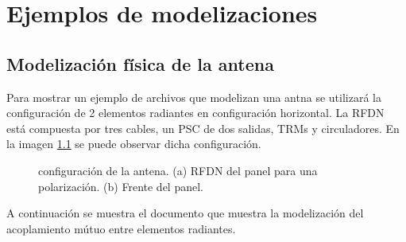 
\chapter{Ejemplos de modelizaciones} %

\label{AppendixC} %


\section{Modelización física de la antena}

Para mostrar un ejemplo de archivos que modelizan una antna se utilizará la configuración de 2 elementos radiantes en 
configuración horizontal. La RFDN está compuesta por tres cables, un PSC de dos salidas, TRMs y circuladores. En la imagen 
\ref{fig:RFDN_configuration} se puede observar dicha configuración.

\begin{figure}[H]
	\centering
	\caption{configuración de la antena. (a) RFDN del panel para una polarización. (b) Frente del panel.}
	\label{fig:RFDN_configuration}
\end{figure}


A continuación se muestra el documento que muestra la modelización del acoplamiento mútuo entre elementos radiantes.


